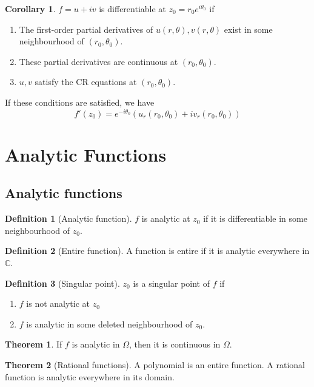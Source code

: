 \documentclass[10pt, a4paper]{extarticle}
\theoremstyle{definition}
\newtheorem{thm}{Theorem}
\newtheorem{cor}{Corollary}[thm]
\newtheorem{defn}{Definition}
\begin{document}
\begin{cor}
	$f=u+iv$ is differentiable at $z_0=r_0e^{i\theta_0}$ if
	\begin{enumerate}
		\item The first-order partial derivatives of $u(r,\theta),v(r,\theta)$ exist in some neighbourhood of $(r_0,\theta_0)$.
		\item These partial derivatives are continuous at $(r_0,\theta_0)$.
		\item $u,v$ satisfy the CR equations at $(r_0,\theta_0)$.
	\end{enumerate}
	If these conditions are satisfied, we have
	\[f'(z_0)=e^{-i\theta_0}(u_r(r_0,\theta_0)+iv_r(r_0,\theta_0))\]
\end{cor}

\section{Analytic Functions}
\subsection{Analytic functions}
\begin{defn}[Analytic function]
	$f$ is analytic at $z_0$ if it is differentiable in some neighbourhood of $z_0$.
\end{defn}

\begin{defn}[Entire function]
	A function is entire if it is analytic everywhere in $\mathbb{C}$.
\end{defn}

\begin{defn}[Singular point]
	$z_0$ is a singular point of $f$ if
	\begin{enumerate}
		\item $f$ is not analytic at $z_0$
		\item $f$ is analytic in some deleted neighbourhood of $z_0$.
	\end{enumerate}
\end{defn}

\begin{thm}
	If $f$ is analytic in $\Omega$, then it is continuous in $\Omega$.
\end{thm}

\begin{thm}[Rational functions]
	A polynomial is an entire function. A rational function is analytic everywhere in its domain.
\end{thm}
\end{document}
